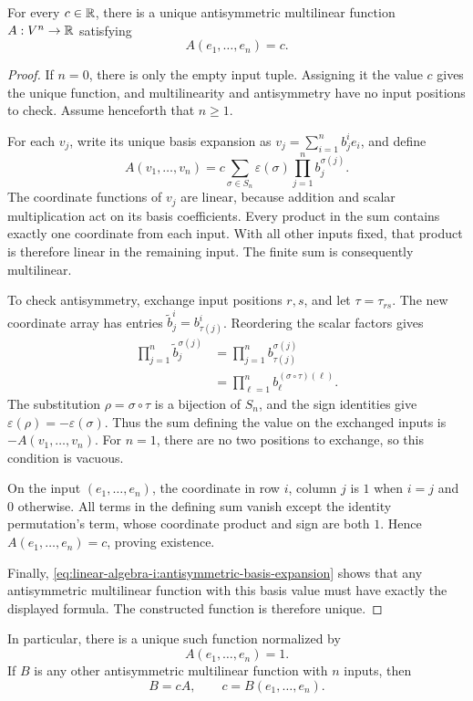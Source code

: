 \begin{theorem}
  \label{thm:linear-algebra-i:normalized-volume-function}
  For every \(c\in\mathbb{R}\), there is a unique antisymmetric multilinear
  function \(A:V^n\to\mathbb{R}\) satisfying
  \[
    A(e_1,\ldots,e_n)=c.
  \]
\end{theorem}
\begin{pendingreview}
\begin{proof}
  If \(n=0\), there is only the empty input tuple. Assigning it the value
  \(c\) gives the unique function, and multilinearity and antisymmetry
  have no input positions to check. Assume henceforth that \(n\geq1\).

  For each \(v_j\), write its unique basis expansion as
  \(v_j=\sum_{i=1}^n b^i_j e_i\), and define
  \[
    A(v_1,\ldots,v_n)
      =c\sum_{\sigma\in S_n}\varepsilon(\sigma)
        \prod_{j=1}^n b^{\sigma(j)}_j.
  \]
  The coordinate functions of \(v_j\) are linear, because addition and
  scalar multiplication act on its basis coefficients. Every product in
  the sum contains exactly one coordinate from each input. With all other
  inputs fixed, that product is therefore linear in the remaining input.
  The finite sum is consequently multilinear.

  To check antisymmetry, exchange input positions \(r,s\), and let
  \(\tau=\tau_{rs}\). The new coordinate array has entries
  \(\widetilde b^i_j=b^i_{\tau(j)}\). Reordering the scalar factors gives
  \[
    \begin{aligned}
      \prod_{j=1}^n\widetilde b^{\sigma(j)}_j
        &=\prod_{j=1}^n b^{\sigma(j)}_{\tau(j)}\\
        &=\prod_{\ell=1}^n b^{(\sigma\circ\tau)(\ell)}_\ell.
    \end{aligned}
  \]
  The substitution \(\rho=\sigma\circ\tau\) is a bijection of
  \(S_n\), and the sign identities give
  \(\varepsilon(\rho)=-\varepsilon(\sigma)\). Thus the sum defining
  the value on the exchanged inputs is \(-A(v_1,\ldots,v_n)\).
  For \(n=1\), there are no two positions to exchange, so this condition
  is vacuous.

  On the input \((e_1,\ldots,e_n)\), the coordinate in row \(i\),
  column \(j\) is \(1\) when \(i=j\) and \(0\) otherwise.
  All terms in the defining sum vanish except the identity permutation's
  term, whose coordinate product and sign are both \(1\). Hence
  \(A(e_1,\ldots,e_n)=c\), proving existence.

  Finally, \autoref{eq:linear-algebra-i:antisymmetric-basis-expansion}
  shows that any antisymmetric multilinear function with this basis value
  must have exactly the displayed formula. The constructed function is
  therefore unique.
\end{proof}
\end{pendingreview}

In particular, there is a unique such function normalized by
\[
  A(e_1,\ldots,e_n)=1.
\]
If \(B\) is any other antisymmetric multilinear
function with \(n\) inputs, then
\[
  B=cA,\qquad c=B(e_1,\ldots,e_n).
\]
